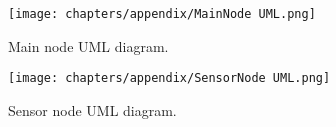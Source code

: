 \begin{figure}[h!]
\centering
\texttt{[image: chapters/appendix/MainNode UML.png]}
\caption{Main node UML diagram.}
\label{fig:mainuml}
\end{figure}

\begin{figure}[h!]
\centering
\texttt{[image: chapters/appendix/SensorNode UML.png]}
\caption{Sensor node UML diagram.}
\label{fig:sensoruml}
\end{figure}